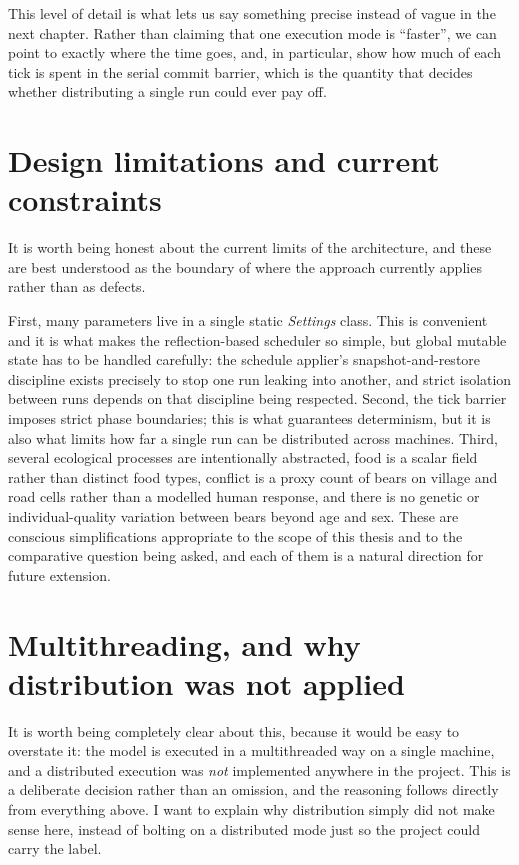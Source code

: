 This level of detail is what lets us say something precise instead of vague in the next chapter. Rather than claiming that one execution mode is ``faster'', we can point to exactly where the time goes, and, in particular, show how much of each tick is spent in the serial commit barrier, which is the quantity that decides whether distributing a single run could ever pay off.

\section{Design limitations and current constraints}

It is worth being honest about the current limits of the architecture, and these are best understood as the boundary of where the approach currently applies rather than as defects.

First, many parameters live in a single static \emph{Settings} class. This is convenient and it is what makes the reflection-based scheduler so simple, but global mutable state has to be handled carefully: the schedule applier's snapshot-and-restore discipline exists precisely to stop one run leaking into another, and strict isolation between runs depends on that discipline being respected. Second, the tick barrier imposes strict phase boundaries; this is what guarantees determinism, but it is also what limits how far a single run can be distributed across machines. Third, several ecological processes are intentionally abstracted, food is a scalar field rather than distinct food types, conflict is a proxy count of bears on village and road cells rather than a modelled human response, and there is no genetic or individual-quality variation between bears beyond age and sex. These are conscious simplifications appropriate to the scope of this thesis and to the comparative question being asked, and each of them is a natural direction for future extension.

\section{Multithreading, and why distribution was not applied}

It is worth being completely clear about this, because it would be easy to overstate it: the model is executed in a multithreaded way on a single machine, and a distributed execution was \emph{not} implemented anywhere in the project. This is a deliberate decision rather than an omission, and the reasoning follows directly from everything above. I want to explain why distribution simply did not make sense here, instead of bolting on a distributed mode just so the project could carry the label.

